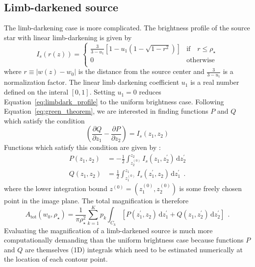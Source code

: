 \documentclass[12pt,dvipsnames]{report}
\newcommand{\ud}{\,\mathrm{d}}
\newcommand{\hquad}{~~}
\begin{document}
\subsection{Limb-darkened source}
\label{ssec:mag_limbdark}
The limb-darkening case is more complicated. The brightness profile of the source star with
linear limb-darkening is given by 
\begin{equation}
    I_s(r(z))=
    \begin{cases}\frac{3}{3-u_1}\left[1 - u_1\left(1 - \sqrt{1-r^2}\right)\right] &\text{if} \quad r\leq\rho_\star\\
        0 &\text{otherwise}\\
    \end{cases}
    \label{eq:limbdark_profile}
\end{equation}
where $r\equiv |w(z)-w_0|$ is the distance from the source center and $\frac{3}{3-u_1}$ is a 
normalization factor. The linear limb darkening coefficient $u_1$
is a real number defined on the interal $[0,1]$. Setting $u_1=0$ reduces 
Equation~\ref{eq:limbdark_profile} to the uniform brightness case.
Following Equation~\ref{eq:green_theorem}, we are interested in finding 
functions $P$ and $Q$ which satisfy the condition
\begin{equation}
\left(\frac{\partial Q}{\partial z_{1}} - 
\frac{\partial P}{\partial z_{2}} \right) = I_s(z_1,z_2)
\end{equation}
Functions which satisfy this condition are given by \citep{1998A&A...333L..79D}:
\begin{align}
P\left(z_1, z_2\right)&=-\frac{1}{2} \int_{z_2^{(0)}}^{z_2} I_s\left(z_1, z_2^{\prime}\right) \ud z_2^{\prime}\\
Q\left(z_1, z_2\right)&=\frac{1}{2} \int_{z_1^{(0)}}^{z_1} I_s\left(z_1^{\prime}, z_2\right) \ud z_1^{\prime}\hquad .
\label{eq:p_and_q_functions_ld}
\end{align}
where the lower integration bound $z^{(0)}=(z_1^{(0)},z_2^{(0)})$ is some freely chosen point
in the image plane. The total magnification is therefore 
\begin{equation}
    A_\mathrm{tot}\left(w_0, \rho_{\star}\right)=\frac{1}{\pi \rho_{\star}^{2}}
    \sum_{k=1}^Kp_k\int_{C_k} \left[P(z_1^\prime, z_2)\ud z_1^\prime + Q(z_1, z_2^\prime)\ud z_2^\prime\right]
    \hquad .
    \label{eq:mag_green_theorem_ld_expanded}
\end{equation}
Evaluating the magnification of a limb-darkened source is much 
more computationally demanding than the uniform brightness case  because functions $P$ and
$Q$ are themselves (1D) integrals which need to be estimated numerically at the location of 
each contour point.
\end{document}
